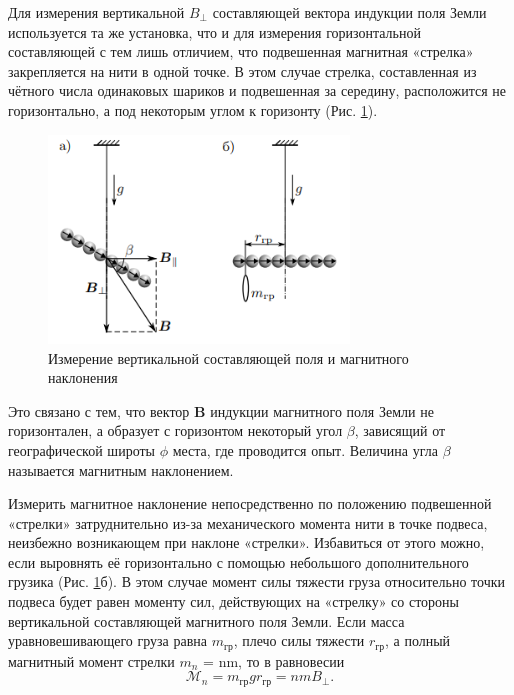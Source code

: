 Для измерения вертикальной $B_{\bot}$ составляющей вектора индукции
поля Земли используется та же установка, что и для измерения горизонтальной составляющей с тем лишь отличием, что подвешенная магнитная «стрелка» закрепляется на нити в одной точке. В этом случае
стрелка, составленная из чётного числа одинаковых шариков и подвешенная за середину, расположится не горизонтально, а под некоторым
углом к горизонту (Рис. \ref{fig:Bbot}).
\begin{figure}[h!]
    \centering
    \includegraphics[width=8cm]{Bbot.png}
    \caption{Измерение вертикальной составляющей поля и магнитного наклонения}
    \label{fig:Bbot}
\end{figure}
Это связано с тем, что вектор \textbf{B} индукции магнитного поля Земли не горизонтален, а образует с горизонтом
некоторый угол $\beta$, зависящий от географической широты $\phi$ места, где
проводится опыт. Величина угла $\beta$ называется магнитным наклонением.

Измерить магнитное наклонение непосредственно по положению подвешенной «стрелки» затруднительно из-за механического момента нити
в точке подвеса, неизбежно возникающем при наклоне «стрелки». Избавиться от этого можно, если выровнять её горизонтально с помощью
небольшого дополнительного грузика (Рис. \ref{fig:Bbot}б). В этом случае момент силы тяжести груза относительно точки подвеса будет равен моменту сил, действующих на «стрелку» со стороны вертикальной составляющей магнитного поля Земли. Если масса уравновешивающего груза равна $m_{гр}$, плечо силы тяжести $r_{гр}$, а полный магнитный момент стрелки $m_n$ = nm, то в равновесии
\begin{equation}
    \mathcal{M}_n=m_{гр}gr_{гр}=nmB_\bot.
\end{equation}
